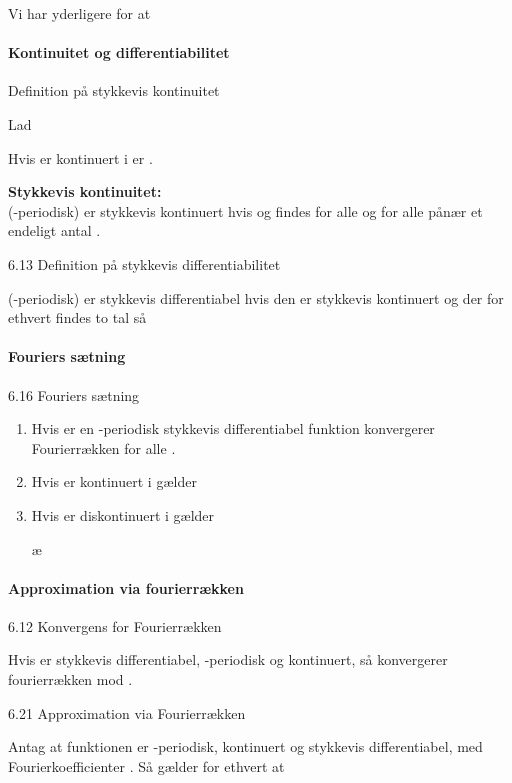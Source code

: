 \documentclass[
]{article}
\begin{document}
Vi har yderligere for {} at

\paragraph{Kontinuitet og
differentiabilitet}\label{kontinuitet-og-differentiabilitet}

Definition på stykkevis kontinuitet

Lad

Hvis {} er kontinuert i {} er {}.

\textbf{Stykkevis kontinuitet:}\\
{} ({}-periodisk) er stykkevis kontinuert hvis {} og {} findes for alle
{} og {} for alle {} pånær et endeligt antal {}.

6.13 Definition på stykkevis differentiabilitet

{} ({}-periodisk) er stykkevis differentiabel hvis den er stykkevis
kontinuert og der for ethvert {} findes to tal {} så

\paragraph{Fouriers sætning}\label{fouriers-suxe6tning}

6.16 Fouriers sætning

\begin{enumerate}
\item
  Hvis {} er en {}-periodisk stykkevis differentiabel funktion
  konvergerer Fourierrækken for alle {}.
\item
  Hvis {} er kontinuert i {} gælder
\item
  Hvis {} er diskontinuert i {} gælder

  æ
\end{enumerate}

\paragraph{Approximation via
fourierrækken}\label{approximation-via-fourierruxe6kken}

6.12 Konvergens for Fourierrækken

Hvis {} er stykkevis differentiabel, {}-periodisk og kontinuert, så
konvergerer fourierrækken mod {}.

6.21 Approximation via Fourierrækken

Antag at funktionen {} er {}-periodisk, kontinuert og stykkevis
differentiabel, med Fourierkoefficienter {}. Så gælder for ethvert {} at
\end{document}
